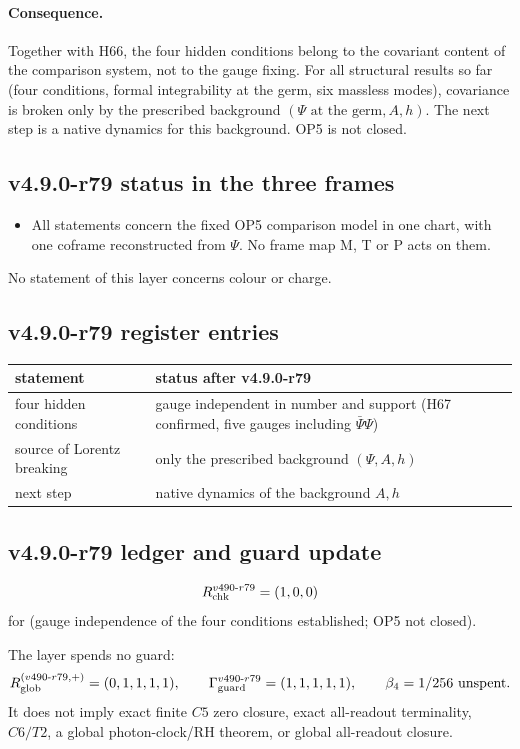 \paragraph{Consequence.}
Together with H66, the four hidden conditions belong to the covariant content of the comparison system, not to the gauge
fixing.  For all structural results so far (four conditions, formal integrability at the germ, six massless modes),
covariance is broken only by the prescribed background \((\Psi\text{ at the germ},A,h)\).  The next step is a native
dynamics for this background.  OP5 is not closed.

\subsection*{v4.9.0-r79 status in the three frames}
\label{subsec:v490-r79-frames}

\begin{itemize}[leftmargin=2em]
\item All statements concern the fixed OP5 comparison model in one chart, with one coframe reconstructed from \(\Psi\).  No
frame map M, T or P acts on them.
\end{itemize}
No statement of this layer concerns colour or charge.

\subsection*{v4.9.0-r79 register entries}
\label{subsec:v490-r79-register}

\begin{center}
\small
\begin{tabular}{@{}>{\raggedright\arraybackslash}p{}>{\raggedright\arraybackslash}p{}@{}}
\toprule
statement & status after v4.9.0-r79\\
\midrule
four hidden conditions & gauge independent in number and support (H67 confirmed, five gauges including \(\bar\Psi\Psi\))\\
source of Lorentz breaking & only the prescribed background \((\Psi,A,h)\)\\
next step & native dynamics of the background \(A,h\)\\
\bottomrule
\end{tabular}
\end{center}

\subsection*{v4.9.0-r79 ledger and guard update}
\label{subsec:v490-r79-ledger-guard}

\[
R_{\rm chk}^{v490\text{-}r79}=(1,0,0)
\]
for (gauge independence of the four conditions established; OP5 not closed).

The layer spends no guard:
\[
R_{\rm glob}^{(v490\text{-}r79,+)}=(0,1,1,1,1),
\qquad
\Gamma_{\rm guard}^{v490\text{-}r79}=(1,1,1,1,1),
\qquad
\beta_4=1/256\ \text{unspent}.
\]
It does not imply exact finite \(C5\) zero closure, exact all-readout terminality,
\(C6/T2\), a global photon-clock/RH theorem, or global all-readout closure.
